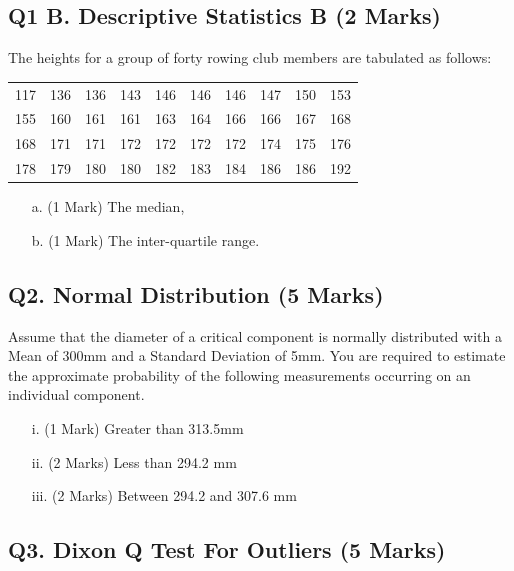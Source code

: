 \documentclass[a4paper,12pt]{article}
\begin{document}
\subsection*{Q1 B. Descriptive Statistics B (2 Marks)} %
The heights for a group of forty rowing club members are tabulated as follows:

\begin{table}[ht]
	\begin{center}
		\begin{tabular}{|rrrrrrrrrr|}
			
			\hline
			117& 136& 136& 143& 146& 146& 146& 147& 150& 153\\
			155& 160& 161& 161& 163& 164& 166& 166& 167& 168\\
			168& 171& 171& 172& 172& 172& 172& 174& 175& 176\\
			178& 179& 180& 180& 182& 183& 184& 186& 186& 192\\
			\hline
		\end{tabular}
	\end{center}
\end{table}
\vspace{-0.5cm}
\begin{itemize}
	\item[a.] (1 Mark) The median,
	\item[b.] (1 Mark) The inter-quartile range.
\end{itemize}
\newpage
\subsection*{Q2. Normal Distribution (5 Marks)} %
Assume that the diameter of a critical component is normally distributed with a Mean of 300mm and a Standard Deviation of 5mm. You are required  to estimate the approximate probability of the following measurements occurring on an individual component.
\begin{itemize}
	\item [i.](1 Mark)	Greater than 313.5mm
	\item [ii.](2 Marks) Less than 294.2 mm
	\item [iii.](2 Marks) Between 294.2 and 307.6 mm
\end{itemize}
\bigskip


\newpage
\subsection*{Q3. Dixon Q Test For Outliers (5 Marks)}
\end{document}
